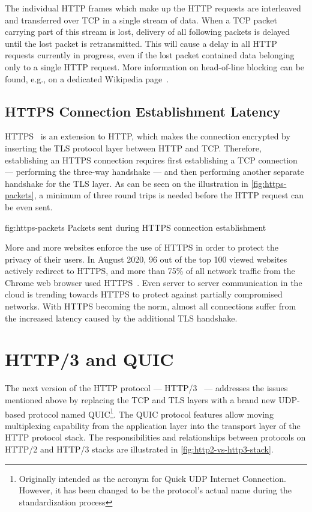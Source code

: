 The individual HTTP frames which make up the HTTP requests are interleaved and transferred over TCP
in a single stream of data. When a TCP packet carrying part of this stream is lost, delivery of all
following packets is delayed until the lost packet is retransmitted. This will cause a delay in all
HTTP requests currently in progress, even if the lost packet contained data belonging only to a
single HTTP request. More information on head-of-line blocking can be found, e.g., on a dedicated
Wikipedia page~\cite{wiki:head-of-line-blocking}.

\subsection*{HTTPS Connection Establishment Latency}

HTTPS~\cite{rfc2818} is an extension to HTTP, which makes the connection encrypted by inserting the
TLS protocol layer between HTTP and TCP. Therefore, establishing an HTTPS connection requires first
establishing a TCP connection --- performing the three-way handshake --- and then performing another
separate handshake for the TLS layer. As can be seen on the illustration in
\autoref{fig:https-packets}, a minimum of three round trips is needed before the HTTP request can be
even sent.

\begin{myFigure} {fig:https-packets} {Packets sent during HTTPS connection establishment}

  \resizebox{0.8\linewidth}{!}{}

\end{myFigure}

More and more websites enforce the use of HTTPS in order to protect the privacy of their users. In
August 2020, 96 out of the top 100 viewed websites actively redirect to HTTPS, and more than 75\% of
all network traffic from the Chrome web browser used HTTPS~\cite{googleTransparency}. Even server to
server communication in the cloud is trending towards HTTPS to protect against partially compromised
networks. With HTTPS becoming the norm, almost all connections suffer from the increased latency
caused by the additional TLS handshake.

\section{HTTP/3 and QUIC}

The next version of the HTTP protocol --- HTTP/3~\cite{draft-ietf-quic-http} --- addresses the issues
mentioned above by replacing the TCP and TLS layers with a brand new UDP-based protocol named
QUIC\footnote{Originally intended as the acronym for Quick UDP Internet Connection. However, it has
been changed to be the protocol's actual name during the standardization process}. The QUIC protocol
features allow moving multiplexing capability from the application layer into the transport layer of
the HTTP protocol stack. The responsibilities and relationships between protocols on HTTP/2 and
HTTP/3 stacks are illustrated in \autoref{fig:http2-vs-http3-stack}.


